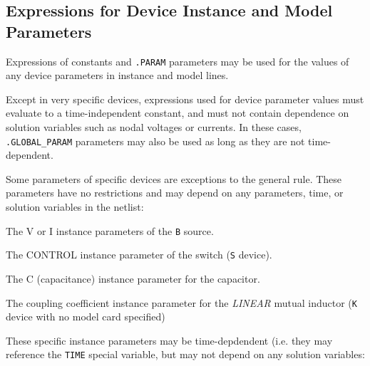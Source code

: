 \subsection{Expressions for Device Instance and Model Parameters}

Expressions of constants and \texttt{.PARAM} parameters may be used
for the values of any device parameters in instance and model lines.

Except in very specific devices, expressions used for device parameter
values must evaluate to a time-independent constant, and must not
contain dependence on solution variables such as nodal voltages or
currents.  In these cases, \texttt{.GLOBAL\_PARAM} parameters may also
be used as long as they are not time-dependent.

\begin{centering}
\end{centering}

Some parameters of specific devices are exceptions to the general
rule.  These parameters have no restrictions and may depend on any
parameters, time, or solution variables in the
netlist:
\begin{XyceItemize}
\item The \textrm{V} or \textrm{I} instance parameters of the
  \texttt{B} source.
\item The \textrm{CONTROL} instance parameter of the switch (\texttt{S}
  device).
\item The \textrm{C} (capacitance) instance parameter for the capacitor.
\item The coupling coefficient instance parameter for the {\em LINEAR}
  mutual inductor (\texttt{K} device with no model card specified)
\end{XyceItemize}

These specific instance parameters may be time-depdendent (i.e. they
may reference the \texttt{TIME} special variable, but may not depend
on any solution variables:

